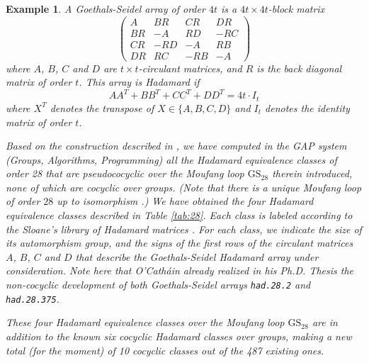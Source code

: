 \documentclass[11pt,a4paper]{article}
\newtheorem{example}[theorem]{Example}
\begin{document}
\begin{example}\label{example_GS28} A {\em Goethals-Seidel array} \citep{GS67} of order $4t$ is a $4t \times 4t$-block matrix
\[\left( \begin{array}{rrrr} A& BR & CR& DR\\ BR &-A& RD& -RC\\ CR&-RD& -A& RB\\ DR& RC& -RB& -A \end{array} \right)\]
where $A$, $B$, $C$ and $D$ are $t\times t$-circulant matrices, and $R$ is the back diagonal matrix of order $t$. This array is Hadamard if
\[AA^T+BB^T+CC^T+DD^T=4t\cdot I_{t}\]
where $X^T$ denotes the transpose of $X\in\{A,B,C,D\}$ and $I_t$ denotes the identity matrix of order $t$.

Based on the construction described in \citep{Alvarez2020}, we have computed in the {\sc GAP} system {\em (Groups, Algorithms, Programming)} \citep{GAP} all the Hadamard equivalence classes of order 28 that are pseudococyclic over the Moufang loop $\mathrm{GS}_{28}$ therein introduced, none of which are cocyclic over groups. (Note that there is a unique Moufang loop of order $28$ up to isomorphism \citealp{Chein1974}.) We have obtained the four Hadamard equivalence classes described in Table \ref{tab:28}. Each class is labeled according to the Sloane's library of Hadamard matrices \citep{Sloane}. For each class, we indicate the size of its automorphism group, and the signs of the first rows of the circulant matrices $A$, $B$, $C$ and $D$ that describe the Goethals-Seidel Hadamard array under consideration. Note here that O'Cath\'ain already realized in his Ph.D. Thesis \citep{OC08} the non-cocyclic development of both Goethals-Seidel arrays \texttt{had.28.2} and \texttt{had.28.375}.

These four Hadamard equivalence classes over the Moufang loop $\mathrm{GS}_{28}$ are in addition to the known six cocyclic Hadamard classes over groups, making a new total (for the moment) of 10 cocyclic classes out of the 487 existing ones.
\end{example}
\end{document}
